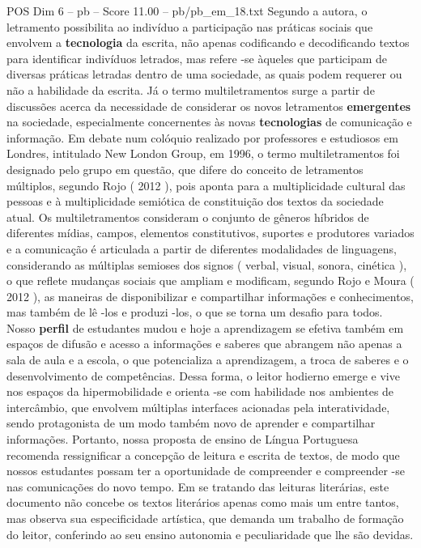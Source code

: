 \begin{textsample}{POS Dim 6 – pb – Score 11.00 – pb/pb\_em\_18.txt}
Segundo a autora, o letramento possibilita ao indivíduo a participação nas práticas sociais que envolvem a \textbf{tecnologia} da escrita, não apenas codificando e decodificando textos para identificar indivíduos letrados, mas refere -se àqueles que participam de diversas práticas letradas dentro de uma sociedade, as quais podem requerer ou não a habilidade da escrita.
Já o termo multiletramentos surge a partir de discussões acerca da necessidade de considerar os novos letramentos \textbf{emergentes} na sociedade, especialmente concernentes às novas \textbf{tecnologias} de comunicação e informação.
Em debate num colóquio realizado por professores e estudiosos em Londres, intitulado New London Group, em 1996, o termo multiletramentos foi designado pelo grupo em questão, que difere do conceito de letramentos múltiplos, segundo Rojo ( 2012 ), pois aponta para a multiplicidade cultural das pessoas e à multiplicidade semiótica de constituição dos textos da sociedade atual.
Os multiletramentos consideram o conjunto de gêneros híbridos de diferentes mídias, campos, elementos constitutivos, suportes e produtores variados e a comunicação é articulada a partir de diferentes modalidades de linguagens, considerando as múltiplas semioses dos signos ( verbal, visual, sonora, cinética ), o que reflete mudanças sociais que ampliam e modificam, segundo Rojo e Moura ( 2012 ), as maneiras de disponibilizar e compartilhar informações e conhecimentos, mas também de lê -los e produzi -los, o que se torna um desafio para todos.
Nosso \textbf{perfil} de estudantes mudou e hoje a aprendizagem se efetiva também em espaços de difusão e acesso a informações e saberes que abrangem não apenas a sala de aula e a escola, o que potencializa a aprendizagem, a troca de saberes e o desenvolvimento de competências.
Dessa forma, o leitor hodierno emerge e vive nos espaços da hipermobilidade e orienta -se com habilidade nos ambientes de intercâmbio, que envolvem múltiplas interfaces acionadas pela interatividade, sendo protagonista de um modo também novo de aprender e compartilhar informações.
Portanto, nossa proposta de ensino de Língua Portuguesa recomenda ressignificar a concepção de leitura e escrita de textos, de modo que nossos estudantes possam ter a oportunidade de compreender e compreender -se nas comunicações do novo tempo.
Em se tratando das leituras literárias, este documento não concebe os textos literários apenas como mais um entre tantos, mas observa sua especificidade artística, que demanda um trabalho de formação do leitor, conferindo ao seu ensino autonomia e peculiaridade que lhe são devidas.

\end{textsample}
